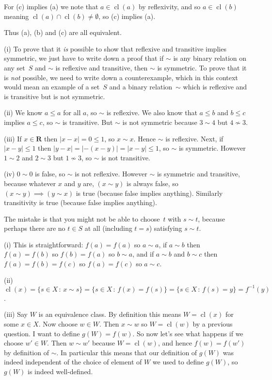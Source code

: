 \documentclass[10pt]{article}
\newcommand{\R}{\mathbf{R}}
\DeclareMathOperator{\cl}{cl}
\begin{document}
For (c) implies (a) we note that $a\in\cl(a)$ by reflexivity, and so $a\in\cl(b)$ meaning $\cl(a)\cap\cl(b)\not=\emptyset$, so (c) implies (a).

Thus (a), (b) and (c) are all equivalent.

\medskip{} 

(i) To prove that it \emph{is} possible to show that reflexive and transitive implies symmetric, we just have to write down a proof that if $\sim$ is any binary relation on any set~$S$ and $\sim$ is reflexive and transitive, then $\sim$ is symmetric. To prove that it is \emph{not} possible, we need to write down a counterexample, which in this context would mean an example of a set~$S$ and a binary relation~$\sim$ which is reflexive and is transitive but is not symmetric.

(ii) We know $a\leq a$ for all $a$, so $\sim$ is reflexive. We also know that $a\leq b$ and $b\leq c$ implies $a\leq c$, so $\sim$ is transitive. But $\sim$ is not symmetric because $3\sim 4$ but $4\not\sim 3$.

(iii) If $x\in\R$ then $|x-x|=0\leq 1$, so $x\sim x$. Hence $\sim$ is reflexive. Next, if $|x-y|\leq 1$ then $|y-x|=|-(x-y)|=|x-y|\leq 1$, so $\sim$ is symmetric. However $1\sim2$ and $2\sim 3$ but $1\not\sim 3$, so $\sim$ is not transitive.

(iv) $0\sim0$ is false, so $\sim$ is not reflexive. However $\sim$ is symmetric and transitive, because whatever $x$ and $y$ are, $(x\sim y)$ is always false, so $(x\sim y)\implies (y\sim x)$ is true (because false implies anything). Similarly transitivity is true (because false implies anything).

\medskip{} The mistake is that you might not be able to choose~$t$ with $s\sim t$, because perhaps there are no $t\in S$ at all (including $t=s$) satisfying $s\sim t$. 

\medskip{} 

(i) This is straightforward: $f(a)=f(a)$ so $a\sim a$, if $a\sim b$ then $f(a)=f(b)$ so $f(b)=f(a)$ so $b\sim a$, and if $a\sim b$ and $b\sim c$ then $f(a)=f(b)=f(c)$ so $f(a)=f(c)$ so $a\sim c$.

(ii) $\cl(x)=\{s\in X\,:\,x\sim s\}=\{s\in X\,:\,f(x)=f(s)\}=\{s\in X\,:\,f(s)=y\}=f^{-1}(y)$.

(iii) Say $W$ is an equivalence class. By definition this means $W=\cl(x)$ for some $x\in X$. Now choose $w\in W$. Then $x\sim w$ so $W=\cl(w)$ by a previous question. I want to define $g(W)=f(w)$. So now let's see what happens if we choose $w'\in W$. Then $w\sim w'$ because $W=\cl(w)$, and hence $f(w)=f(w')$ by definition of $\sim$. In particular this means that our definition of $g(W)$ was indeed independent of the choice of element of $W$ we used to define $g(W)$, so $g(W)$ is indeed well-defined.
\end{document}
